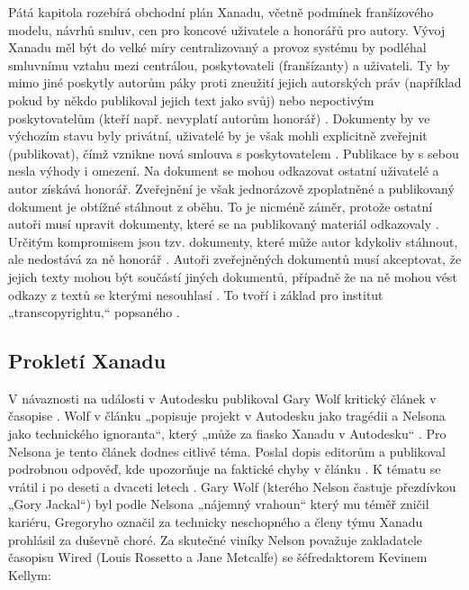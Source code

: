 \label{p:litmachines:business}
Pátá kapitola rozebírá obchodní plán Xanadu, včetně podmínek franšízového modelu, návrhů smluv, cen pro koncové uživatele a honorářů pro autory. Vývoj Xanadu měl být do velké míry centralizovaný a provoz systému by podléhal smluvnímu vztahu mezi centrálou, poskytovateli (franšízanty) a uživateli. Ty by mimo jiné poskytly autorům páky proti zneužití jejich autorských práv (například pokud by někdo publikoval jejich text jako svůj) nebo nepoctivým poskytovatelům (kteří např. nevyplatí autorům honorář) \autocite[5/16--5/18]{LitMachines}. Dokumenty by ve výchozím stavu byly privátní, uživatelé by je však mohli explicitně zveřejnit (publikovat), čímž vznikne nová smlouva s poskytovatelem \autocite[5/19--5/21]{LitMachines}. Publikace by s sebou nesla výhody i omezení. Na dokument se mohou odkazovat ostatní uživatelé a autor získává honorář. Zveřejnění je však jednorázově zpoplatněné a publikovaný dokument je obtížné stáhnout z oběhu. %
To je nicméně záměr, protože ostatní autoři musí upravit dokumenty, které se na publikovaný materiál odkazovaly \autocite[2/42--2/43]{LitMachines}. Určitým kompromisem jsou tzv.  dokumenty, které může autor kdykoliv stáhnout, ale nedostává za ně honorář \autocite[2/44]{LitMachines}. Autoři zveřejněných dokumentů musí akceptovat, že jejich texty mohou být součástí jiných dokumentů, případně že na ně mohou vést odkazy z textů se kterými nesouhlasí \autocite[5/20--5/21]{LitMachines}. To tvoří i základ pro institut „transcopyrightu,“ popsaného .

\subsection{Prokletí Xanadu}
\label{sec:xanadu:curse}

V návaznosti na události v Autodesku publikoval Gary Wolf kritický článek  v časopise  \autocite{Wolf1995}. Wolf v článku „popisuje projekt v Autodesku jako tragédii a Nelsona jako technického ignoranta“, který „může za fiasko Xanadu v Autodesku“ \autocite[81]{Barnet2014}.
Pro Nelsona je tento článek dodnes citlivé téma. Poslal dopis editorům \autocite{Nelson:wired} a publikoval podrobnou odpověď, kde upozorňuje na faktické chyby v článku \autocite{Nelson:ararat}.
K tématu se vrátil i po deseti a dvaceti letech \autocites{trollout}{Nelson:20th}. Gary Wolf (kterého Nelson častuje přezdívkou „Gory Jackal“) byl podle Nelsona „nájemný vrahoun“ který mu téměř zničil kariéru, Gregoryho označil za technicky neschopného a členy týmu Xanadu prohlásil za duševně choré. Za skutečné viníky Nelson považuje zakladatele časopisu Wired (Louis Rossetto a Jane Metcalfe) se šéfredaktorem Kevinem Kellym:


